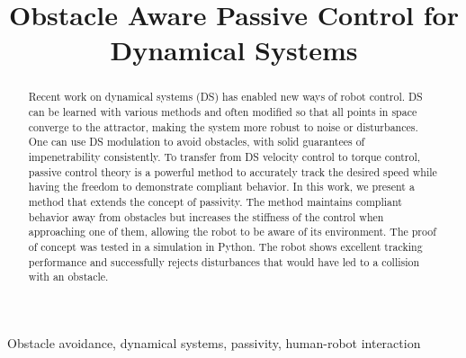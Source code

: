 \documentclass[conference]{IEEEtran}
\begin{document}
\newcommand{\vect}[1]{\boldsymbol{#1}}
\newcommand{\vecs}[1]{\boldsymbol{#1}}
\newcommand{\matr}[1]{\boldsymbol{#1}}
\newcommand{\matd}[1]{\mathcal{#1}}

\newcommand{\dotprod}[2]{\left\langle {#1}, \, {#2} \right\rangle}
\newcommand{\normdotprod}[2]{\frac{\left\langle #1, \, #2 \right\rangle}{\| #1 \| \, \| #2 \|}}

\newtheorem{theorem}{Theorem}[section]
\newtheorem{corollary}{Corollary}[section]
\newtheorem{lemma}{Lemma}[section]
\theoremstyle{definition}
\newtheorem{definition}{Definition}[section]


\title{Obstacle Aware Passive Control for Dynamical Systems}
\author{
}

\maketitle
\thispagestyle{plain}
\pagestyle{plain}

\begin{abstract}
Recent work on dynamical systems (DS) has enabled new ways of robot control. DS can be learned with various methods and often modified so that all points in space converge to the attractor, making the system more robust to noise or disturbances.
One can use DS modulation to avoid obstacles, with solid guarantees of impenetrability consistently. To transfer from DS velocity control to torque control, passive control theory is a powerful method to accurately track the desired speed while having the freedom to demonstrate compliant behavior.
In this work, we present a method that extends the concept of passivity.
The method maintains compliant behavior away from obstacles but increases the stiffness of the control when approaching one of them, allowing the robot to be aware of its environment.
The proof of concept was tested in a simulation in Python. The robot shows excellent tracking performance and successfully rejects disturbances that would have led to a collision with an obstacle. 
\end{abstract}

\begin{IEEEkeywords}
Obstacle avoidance, dynamical systems, passivity, human-robot interaction
\end{IEEEkeywords}



\end{document}
